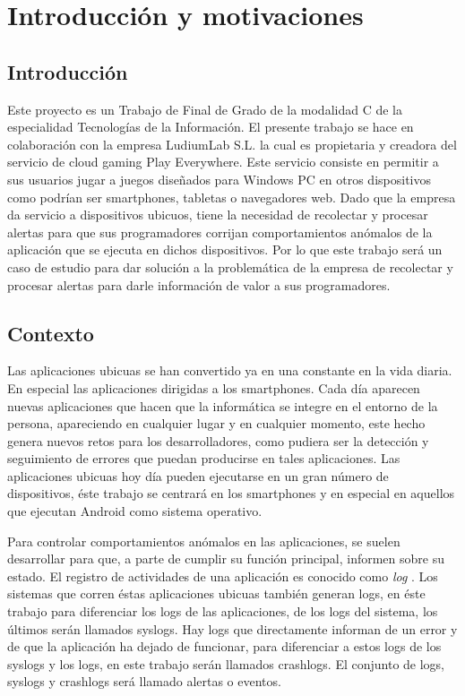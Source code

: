 \chapter{Introducción y motivaciones}

\section{Introducción}
Este proyecto es un Trabajo de Final de Grado de la modalidad C de la especialidad Tecnologías de la Información. El presente trabajo se hace en colaboración con la empresa LudiumLab S.L. la cual es propietaria y creadora del servicio de cloud gaming Play Everywhere. Este servicio consiste en permitir a sus usuarios jugar a juegos diseñados para Windows PC en otros dispositivos como podrían ser smartphones, tabletas o navegadores web. Dado que la empresa da servicio a dispositivos ubicuos, tiene la necesidad de recolectar y procesar alertas para que sus programadores corrijan comportamientos anómalos de la aplicación que se ejecuta en dichos dispositivos. Por lo que este trabajo será un caso de estudio para dar solución a la problemática de la empresa de recolectar y procesar alertas para darle información de valor a sus programadores.

\section{Contexto}
Las aplicaciones ubicuas \cite{Tfg:ubiquitous} se han convertido ya en una constante en la vida diaria. En especial las aplicaciones dirigidas a los smartphones. Cada día aparecen nuevas aplicaciones que hacen que la informática se integre en el entorno de la persona, apareciendo en cualquier lugar y en cualquier momento, este hecho genera nuevos retos para los desarrolladores, como pudiera ser la detección y seguimiento de errores que puedan producirse en tales aplicaciones. Las aplicaciones ubicuas hoy día pueden ejecutarse en un gran número de dispositivos, éste trabajo se centrará en los smartphones y en especial en aquellos que ejecutan Android como sistema operativo.

Para controlar comportamientos anómalos en las aplicaciones, se suelen desarrollar para que, a parte de cumplir su función principal, informen sobre su estado. El registro de actividades de una aplicación es conocido como \textit{log} \cite{Tfg:thelog}. Los sistemas que corren éstas aplicaciones ubicuas también generan logs, en éste trabajo para diferenciar los logs de las aplicaciones, de los logs del sistema, los últimos serán llamados syslogs. Hay logs que directamente informan de un error y de que la aplicación ha dejado de funcionar, para diferenciar a estos logs de los syslogs y los logs, en este trabajo serán llamados crashlogs. El conjunto de logs, syslogs y crashlogs será llamado alertas o eventos.


